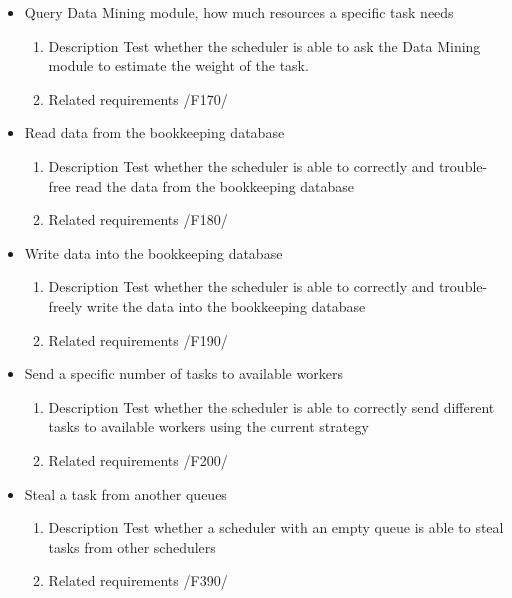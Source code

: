 {\begin{itemize}
				\item Query Data Mining module, how much resources a specific task needs
				\begin{enumerate}
					\item Description\newline
Test whether the scheduler is able to ask the Data Mining module to estimate the weight of the task.
					\item Related requirements\newline
						/F170/
				\end{enumerate}
				
				
				\item Read data from the bookkeeping database
				\begin{enumerate}
					\item Description\newline
Test whether the scheduler is able to correctly and trouble-free read the data from the bookkeeping database
					\item Related requirements\newline
						/F180/
				\end{enumerate}
				
				
				\item Write data into the bookkeeping database
				\begin{enumerate}
					\item Description\newline
Test whether the scheduler is able to correctly and trouble-freely write the data into the bookkeeping database
					\item Related requirements\newline
						/F190/
				\end{enumerate}
				
				
				\item Send a specific number of tasks to available workers
				\begin{enumerate}
					\item Description\newline
Test whether the scheduler is able to correctly send different tasks to available workers using the current strategy
					\item Related requirements\newline
						/F200/
				\end{enumerate}
								
			
			
			
				\item Steal a task from another queues
				\begin{enumerate}
					\item Description\newline
Test whether a scheduler with an empty queue is able to steal tasks from other schedulers
					\item Related requirements\newline
						/F390/
				\end{enumerate}
							

\end{itemize}}
